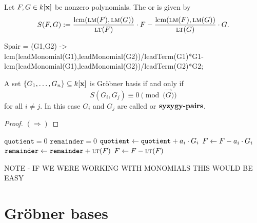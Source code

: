 \documentclass{ximera}
\begin{document}
\begin{definition}
  Let $F,G\in k[\mathbf{x}]$ be nonzero polynomials. The  or
   is given by
  \[
  S(F,G) := \frac{\operatorname{lcm}(\textsc{lm}(F),\textsc{lm}(G))}{\textsc{lt}(F)}\cdot F - \frac{\operatorname{lcm}(\textsc{lm}(F),\textsc{lm}(G))}{\textsc{lt}(G)}\cdot G.
  \]
\end{definition}

\begin{macaulay2}
Spair = (G1,G2) ->
lcm(leadMonomial(G1),leadMonomial(G2))/leadTerm(G1)*G1-
lcm(leadMonomial(G1),leadMonomial(G2))/leadTerm(G2)*G2;
\end{macaulay2}





\begin{theorem}
  A set $\{G_1,\dots,G_n\}\subseteq k[\mathbf{x}]$ is Gr\"obner basis if and
  only if
  \[
  S(G_i,G_j) \equiv 0 \pmod{(\vec{G}})
  \]
  for all $i\ne j$. In this case $G_i$ and $G_j$ are called
   or $\dfn{syzygy-pairs}$.
  \begin{proof}
    $(\Rightarrow)$
  \end{proof}
\end{theorem}




\begin{algorithm}
  \hfill
  \begin{algorithmic}[1]
    \State $\texttt{quotient} = 0$
    \State $\texttt{remainder} = 0$
    \Repeat
    \State $\texttt{quotient} \leftarrow \texttt{quotient} + a_i\cdot G_i$
    \State $F \leftarrow F - a_i\cdot G_i$
    \Else
    \State $\texttt{remainder} \leftarrow \texttt{remainder} + \textsc{lt}(F)$
    \State $F\leftarrow F- \textsc{lt}(F)$
    \EndIf
  \end{algorithmic}
\end{algorithm}


NOTE - IF WE WERE WORKING WITH MONOMIALS THIS WOULD BE EASY



\section{Gr\"obner bases}
\end{document}
